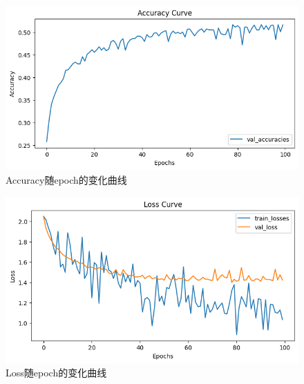 \documentclass[12pt]{article}
\begin{document}
\begin{figure}[htbp]
  \centering
  \includegraphics[scale=0.75]{figures/nn/accuracy_curve.png}
  \caption{Accuracy随epoch的变化曲线}
  \label{fig:accuracy_curve}
\end{figure}

\begin{figure}[htbp]
  \centering
  \includegraphics[scale=0.75]{figures/nn/loss_curve.png}
  \caption{Loss随epoch的变化曲线}
  \label{fig:loss_curve}
\end{figure}
\end{document}

